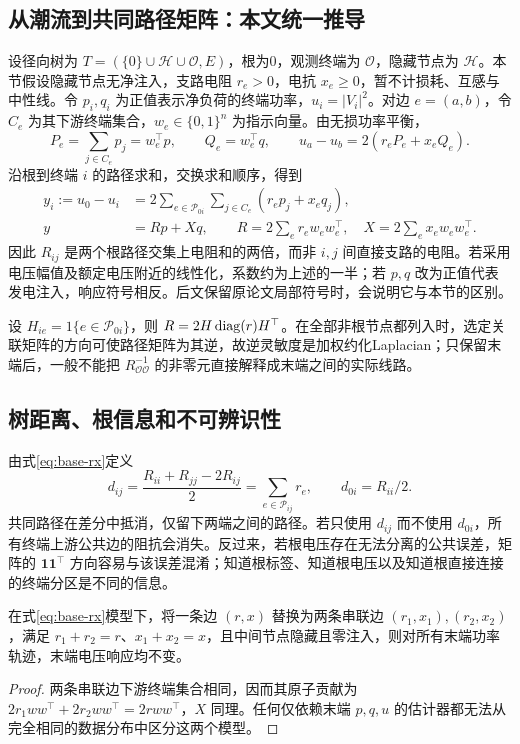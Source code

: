 \subsection{从潮流到共同路径矩阵：本文统一推导}
设径向树为 $T=(\{0\}\cup\mathcal H\cup\mathcal O,E)$，根为0，观测终端为 $\mathcal O$，隐藏节点为 $\mathcal H$。本节假设隐藏节点无净注入，支路电阻 $r_e>0$，电抗 $x_e\geq0$，暂不计损耗、互感与中性线。令 $p_i,q_i$ 为正值表示净负荷的终端功率，$u_i=|V_i|^2$。对边 $e=(a,b)$，令 $C_e$ 为其下游终端集合，$w_e\in\{0,1\}^n$ 为指示向量。由无损功率平衡，
\begin{equation}
 P_e=\sum_{j\in C_e}p_j=w_e^\top p,\qquad Q_e=w_e^\top q,
 \qquad u_a-u_b=2(r_eP_e+x_eQ_e).
\end{equation}
沿根到终端 $i$ 的路径求和，交换求和顺序，得到
\begin{align}
 y_i:=u_0-u_i
 &=2\sum_{e\in\mathcal P_{0i}}\sum_{j\in C_e}(r_ep_j+x_eq_j),\\
 y&=Rp+Xq,\qquad
 R=2\sum_e r_ew_ew_e^\top,\quad X=2\sum_e x_ew_ew_e^\top.
 \label{eq:base-rx}
\end{align}
因此 $R_{ij}$ 是两个根路径交集上电阻和的两倍，而非 $i,j$ 间直接支路的电阻。若采用电压幅值及额定电压附近的线性化，系数约为上述的一半；若 $p,q$ 改为正值代表发电注入，响应符号相反。后文保留原论文局部符号时，会说明它与本节的区别。

设 $H_{ie}=1\{e\in\mathcal P_{0i}\}$，则 $R=2H\operatorname{diag}(r)H^\top$。在全部非根节点都列入时，选定关联矩阵的方向可使路径矩阵为其逆，故逆灵敏度是加权约化Laplacian；只保留末端后，一般不能把 $R_{\mathcal O\mathcal O}^{-1}$ 的非零元直接解释成末端之间的实际线路。

\subsection{树距离、根信息和不可辨识性}
由式\eqref{eq:base-rx}定义
\begin{equation}
 d_{ij}=\frac{R_{ii}+R_{jj}-2R_{ij}}{2}
       =\sum_{e\in\mathcal P_{ij}}r_e,
 \qquad d_{0i}=R_{ii}/2.
 \label{eq:base-distance}
\end{equation}
共同路径在差分中抵消，仅留下两端之间的路径。若只使用 $d_{ij}$ 而不使用 $d_{0i}$，所有终端上游公共边的阻抗会消失。反过来，若根电压存在无法分离的公共误差，矩阵的 $\mathbf1\mathbf1^\top$ 方向容易与该误差混淆；知道根标签、知道根电压以及知道根直接连接的终端分区是不同的信息。

\begin{proposition}
在式\eqref{eq:base-rx}模型下，将一条边 $(r,x)$ 替换为两条串联边 $(r_1,x_1),(r_2,x_2)$，满足 $r_1+r_2=r$、$x_1+x_2=x$，且中间节点隐藏且零注入，则对所有末端功率轨迹，末端电压响应均不变。
\end{proposition}
\begin{proof}
两条串联边下游终端集合相同，因而其原子贡献为
$2r_1ww^\top+2r_2ww^\top=2rww^\top$，$X$ 同理。任何仅依赖末端 $p,q,u$ 的估计器都无法从完全相同的数据分布中区分这两个模型。
\end{proof}

